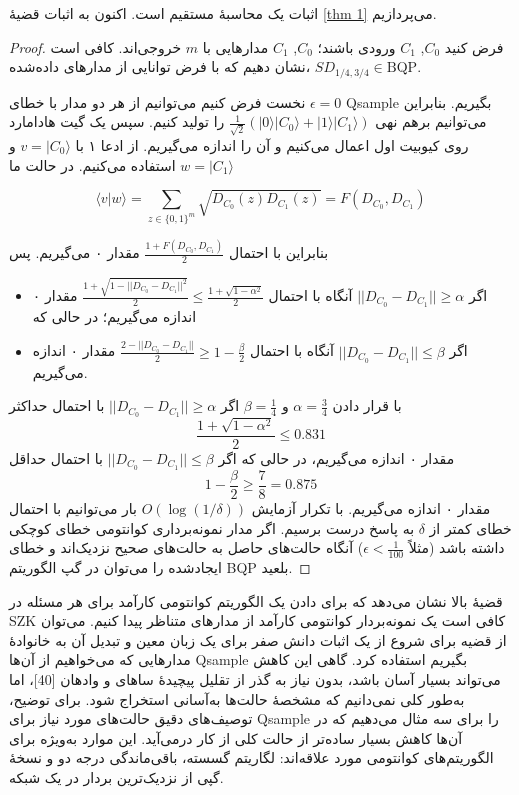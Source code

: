 اثبات یک محاسبهٔ مستقیم است. اکنون به اثبات قضیهٔ \ref{thm 1} می‌پردازیم.
\begin{proof}
 فرض کنید $C_0$, $C_1$ ورودی  باشند؛ $C_0$, $C_1$ مدارهایی با $m$ خروجی‌اند. کافی است نشان دهیم که با فرض توانایی  از مدارهای داده‌شده،
$SD_{1/4,3/4} \in \mathrm{BQP}$.

نخست فرض کنیم می‌توانیم از هر دو مدار با خطای $\epsilon = 0$ Qsample بگیریم. بنابراین می‌توانیم برهم نهی $\frac{1}{\sqrt{2}}(|0\rangle |C_0\rangle + |1\rangle |C_1\rangle)$ را تولید کنیم. سپس یک گیت هادامارد روی کیوبیت اول اعمال می‌کنیم و آن را اندازه می‌گیریم. از ادعا ۱ با $v = |C_0\rangle$ و $w = |C_1\rangle$ استفاده می‌کنیم. در حالت ما

\begin{equation}
	\langle v|w\rangle = \sum_{z \in \{0,1\}^m} \sqrt{D_{C_0}(z) D_{C_1}(z)} = F(D_{C_0}, D_{C_1})
\end{equation}

بنابراین با احتمال $\frac{1 + F(D_{C_0}, D_{C_1})}{2}$ مقدار ۰ می‌گیریم. پس
\begin{itemize}
	\item 
	 اگر $||D_{C_0} - D_{C_1}|| \ge \alpha$ آنگاه با احتمال $\frac{1 + \sqrt{1 - ||D_{C_0} - D_{C_1}||^2}}{2} \le \frac{1 + \sqrt{1 - \alpha^2}}{2}$ مقدار ۰ اندازه می‌گیریم؛ در حالی که 
	\item
	اگر $||D_{C_0} - D_{C_1}|| \le \beta$ آنگاه با احتمال $\frac{2 - ||D_{C_0} - D_{C_1}||}{2} \ge 1 - \frac{\beta}{2}$ مقدار ۰ اندازه می‌گیریم.
\end{itemize}

 با قرار دادن $\alpha = \frac{3}{4}$ و $\beta = \frac{1}{4}$ اگر $||D_{C_0} - D_{C_1}|| \ge \alpha$ با احتمال حداکثر 
$$\frac{1 + \sqrt{1 - \alpha^2}}{2} \le 0.831$$
 مقدار ۰ اندازه می‌گیریم، در حالی که اگر $||D_{C_0} - D_{C_1}|| \le \beta$ با احتمال حداقل 
 $$1 - \frac{\beta}{2} \ge \frac{7}{8} = 0.875$$
 مقدار ۰ اندازه می‌گیریم. با تکرار آزمایش $O(\log(1/\delta))$ بار می‌توانیم با احتمال خطای کمتر از $\delta$ به پاسخ درست برسیم. اگر مدار نمونه‌برداری کوانتومی خطای کوچکی داشته باشد (مثلاً $\epsilon < \frac{1}{100}$) آنگاه حالت‌های حاصل به حالت‌های صحیح نزدیک‌اند و خطای ایجادشده را می‌توان در گپ الگوریتم BQP بلعید.
\end{proof}
قضیهٔ بالا نشان می‌دهد که برای دادن یک الگوریتم کوانتومی کارآمد برای هر مسئله در SZK کافی است یک نمونه‌بردار کوانتومی کارآمد از مدارهای متناظر پیدا کنیم. می‌توان از قضیه برای شروع از یک اثبات دانش صفر برای یک زبان معین و تبدیل آن به خانوادهٔ مدارهایی که می‌خواهیم از آن‌ها Qsample بگیریم استفاده کرد. گاهی این کاهش می‌تواند بسیار آسان باشد، بدون نیاز به گذر از تقلیل پیچیدهٔ ساهای و وادهان [40]، اما به‌طور کلی نمی‌دانیم که مشخصهٔ حالت‌ها به‌آسانی استخراج شود. برای توضیح، توصیف‌های دقیق حالت‌های مورد نیاز برای Qsample را برای سه مثال می‌دهیم که در آن‌ها کاهش بسیار ساده‌تر از حالت کلی از کار درمی‌آید. این موارد به‌ویژه برای الگوریتم‌های کوانتومی مورد علاقه‌اند: لگاریتم گسسته، باقی‌ماندگی درجه دو و نسخهٔ گپی از نزدیک‌ترین بردار در یک شبکه.

